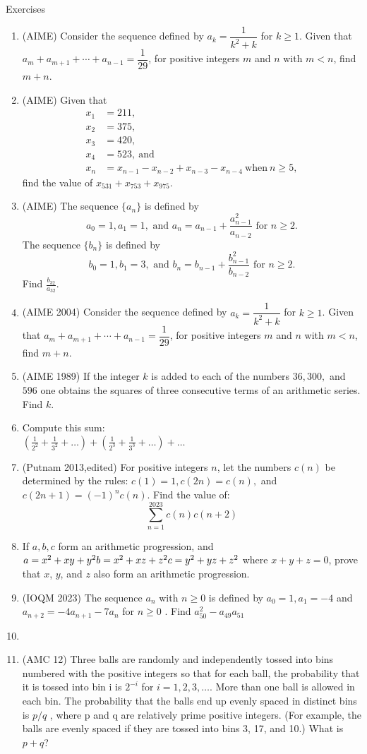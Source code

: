 \begin{xcb}{Exercises}
\begin{enumerate}
\item (AIME) Consider the sequence defined by $a_k =\dfrac{1}{k^2+k}$ for $k\geq 1$. Given that $a_m+a_{m+1}+\cdots+a_{n-1}=\dfrac{1}{29}$, for positive integers $m$ and $n$ with $m<n$, find $m+n$.
\item (AIME) Given that
\begin{align*}x_{1}&=211,\\ x_{2}&=375,\\ x_{3}&=420,\\ x_{4}&=523,\ \text{and}\\ x_{n}&=x_{n-1}-x_{n-2}+x_{n-3}-x_{n-4}\ \text{when}\ n\geq5, \end{align*}
find the value of $x_{531}+x_{753}+x_{975}$.
\item (AIME) The sequence $\{a_n\}$ is defined by\[a_0 = 1,a_1 = 1, \text{ and } a_n = a_{n - 1} + \frac {a_{n - 1}^2}{a_{n - 2}}\text{ for }n\ge2.\]The sequence $\{b_n\}$ is defined by\[b_0 = 1,b_1 = 3, \text{ and } b_n = b_{n - 1} + \frac {b_{n - 1}^2}{b_{n - 2}}\text{ for }n\ge2.\]Find $\frac {b_{32}}{a_{32}}$.
\item (AIME 2004) Consider the sequence defined by $a_k =\dfrac{1}{k^2+k}$ for $k\geq 1$. Given that $a_m+a_{m+1}+\cdots+a_{n-1}=\dfrac{1}{29}$, for positive integers $m$ and $n$ with $m<n$, find $m+n$.
\item (AIME 1989) If the integer $k$ is added to each of the numbers $36, 300,$ and $596$ one obtains
the squares of three consecutive terms of an arithmetic series. Find $k$.
\item Compute this sum:\\
$(\frac{1}{2^2}+\frac{1}{3^2}+\dots)+(\frac{1}{2^3}+\frac{1}{3^3}+\dots)+\dots$
\item (Putnam 2013,edited) For positive integers $n$, let the numbers $c(n)$ be determined by the rules: $c(1) = 1, c(2n) = c(n),$ and $c(2n + 1) = (-1)^nc(n)$. Find the value of:\\
\[\sum_{n=1}^{2023}c(n)c(n+2)\]
\item If $a, b,c$ form an arithmetic progression, and
$a = x^2 + xy + y^2\\
b = x^2 + xz + z^2\\
c = y^2 + yz + z^2$
where $x + y + z = 0$, prove that $x$, $y$, and $z$ also form an arithmetic progression.
\item (IOQM 2023) The sequence $a_n$ with $n\geq 0$ is defined by $a_0 = 1, a_1 = -4$ and $a_{n+2} = -4a_{n+1}- 7a_n$ for $n \geq 0$ . Find $a_{50}^2 - a_{49}a_{51}$
\item \item (AMC 12)  Three balls are randomly and independently tossed into bins numbered with the positive integers so that for each ball, the probability that it is tossed into bin i is $2^{-i}$ for $i = 1, 2, 3, \dots$. More than one ball is allowed in each bin. The probability that the balls end up evenly spaced in distinct bins is $p/q$ , where p and q are relatively prime positive integers. (For example, the balls are evenly spaced if they are tossed into bins 3, 17, and
10.) What is $p + q$?

\end{enumerate}
\end{xcb}